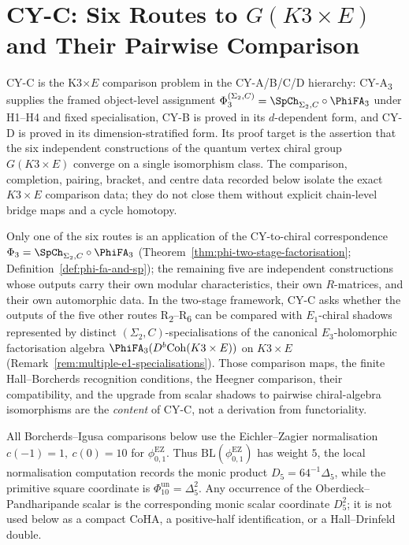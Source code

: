 \chapter{CY-C: Six Routes to \texorpdfstring{$G(K3 \times E)$}{G(K3 x E)} and Their Pairwise Comparison}
\label{ch:cy-c-six-routes-convergence}

\providecommand{\CoHA}{\mathrm{CoHA}}
\providecommand{\Coh}{\mathrm{Coh}}
\providecommand{\HH}{\mathrm{HH}}
\providecommand{\Sym}{\mathrm{Sym}}
\providecommand{\Hilb}{\mathrm{Hilb}}
\providecommand{\Eone}{E_{1}}
\providecommand{\Etwo}{E_{2}}
\providecommand{\LNar}{\Lambda_{\mathrm{Nar}}}
\providecommand{\rhoR}{\rho}
\providecommand{\kch}{\kappa_{\mathrm{ch}}}

CY-C is the K3$\times E$ comparison problem in the CY-A/B/C/D hierarchy:
CY-A\textsubscript{3} supplies the framed object-level assignment
$\Phi_3^{(\Sigma_2,C)}=\SpCh_{\Sigma_2,C}\circ\PhiFA_3$ under H1--H4
and fixed specialisation, CY-B is proved in its $d$-dependent form, and
CY-D is proved in its dimension-stratified form. Its proof target is
the assertion that the six independent constructions of the quantum
vertex chiral group $G(K3 \times E)$ converge on a single isomorphism
class. The comparison, completion, pairing, bracket, and centre data
recorded below isolate the exact $K3 \times E$ comparison data; they do not
close them without explicit chain-level bridge maps and a cycle
homotopy.

Only one of the six routes is an application of the CY-to-chiral correspondence $\Phi_3 = \SpCh_{\Sigma_2, C} \circ \PhiFA_3$ (Theorem~\ref{thm:phi-two-stage-factorisation}; Definition~\ref{def:phi-fa-and-sp}); the remaining five are independent constructions whose outputs carry their own modular characteristics, their own $R$-matrices, and their own automorphic data. In the two-stage framework, CY-C asks whether the outputs of the five other routes R\textsubscript{2}--R\textsubscript{6} can be compared with $\Eone$-chiral shadows represented by distinct $(\Sigma_2, C)$-specialisations of the canonical $E_3$-holomorphic factorisation algebra $\PhiFA_3(D^b\Coh(K3 \times E))$ on $K3 \times E$ (Remark~\ref{rem:multiple-e1-specialisations}). Those comparison maps, the finite Hall--Borcherds recognition conditions, the Heegner comparison, their compatibility, and the upgrade from scalar shadows to pairwise chiral-algebra isomorphisms are the \emph{content} of CY-C, not a derivation from functoriality.

All Borcherds--Igusa comparisons below use the Eichler--Zagier
normalisation \(c(-1)=1,\ c(0)=10\) for
\(\phi_{0,1}^{\mathrm{EZ}}\). Thus
\(\mathrm{BL}(\phi_{0,1}^{\mathrm{EZ}})\) has weight \(5\), the local
normalisation computation records the monic product
\(D_5=64^{-1}\Delta_5\), while the primitive square coordinate is
\(\Phi_{10}^{\mathrm{un}}=\Delta_5^2\). Any occurrence of the
Oberdieck--Pandharipande scalar is the corresponding monic scalar
coordinate \(D_5^2\); it is not used below as a compact CoHA, a
positive-half identification, or a Hall--Drinfeld double.

